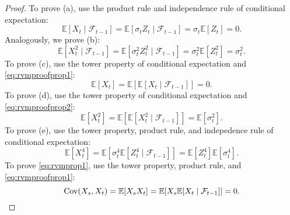 \begin{proof}
To prove (a), use the product rule and independence rule of conditional expectation:
\begin{equation}\label{eq:rvmproofprop1}
    \mathbb{E}[X_{t}\mid\mathcal{F}_{t-1}]=\mathbb{E}[\sigma_{t}Z_{t}\mid\mathcal{F}_{t-1}]=\sigma_{t}\mathbb{E}[Z_{t}]=0.
\end{equation}
Analogously, we prove (b):
\begin{equation}\label{eq:rvmproofprop2}
    \mathbb{E}[X_{t}^{2}\mid\mathcal{F}_{t-1}]=\mathbb{E}[\sigma_{t}^{2}Z_{t}^{2}\mid\mathcal{F}_{t-1}]=\sigma_{t}^{2}\mathbb{E}[Z_{t}^{2}]=\sigma_{t}^{2}.
\end{equation}
To prove (c), use the tower property of conditional expectation and \eqref{eq:rvmproofprop1}:
\begin{equation*}
    \mathbb{E}[X_{t}]=\mathbb{E}[\mathbb{E}[X_{t}\mid\mathcal{F}_{t-1}]]=0.
\end{equation*}
To prove (d), use the tower property of conditional expectation and \eqref{eq:rvmproofprop2}:
\begin{equation*}
    \mathbb{E}[X_{t}^{2}]=\mathbb{E}[\mathbb{E}[X_{t}^{2}\mid\mathcal{F}_{t-1}]]=\mathbb{E}[\sigma_{t}^{2}].
\end{equation*}
To prove (e), use the tower property, product rule, and indepedence rule of conditional expectation:
\begin{equation*}
    \mathbb{E}[X_{t}^{4}]=\mathbb{E}[\sigma_{t}^{4}\mathbb{E}[Z_{t}^{4}\mid\mathcal{F}_{t-1}]]=\mathbb{E}[Z_{t}^{4}]\mathbb{E}[\sigma_{t}^{4}].
\end{equation*}
To prove \eqref{eq:rvmprop1}, use the tower property, product rule, and \eqref{eq:rvmproofprop1}:
\begin{equation*}
    \mathrm{Cov}(X_{s},X_{t})=\mathbb{E}[X_{s}X_{t}]=\mathbb{E}[X_{s}\mathbb{E}[X_{t}\mid\mathcal{F}_{t-1}]]=0.\qedhere
\end{equation*}
\end{proof}
